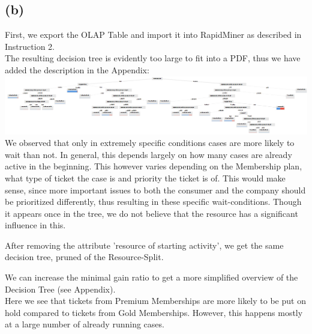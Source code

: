\documentclass[../../main.tex]{subfiles}
\begin{document}
\subsection*{(b)}
First, we export the OLAP Table and import it into RapidMiner as described in Instruction 2.\\
The resulting decision tree is evidently too large to fit into a PDF, thus we have added the description in the Appendix:\\
\includegraphics[width=\columnwidth]{img/RapidMiner_b_Decision_Tree.png}\\
We observed that only in extremely specific conditions cases are more likely to wait than not. In general, this depends largely on how many cases are already active in the beginning. This however varies depending on the Membership plan, what type of ticket the case is and priority the ticket is of. This would make sense, since more important issues to both the consumer and the company should be prioritized differently, thus resulting in these specific wait-conditions. Though it appears once in the tree, we do not believe that the resource has a significant influence in this.

After removing the attribute 'resource of starting activity', we get the same decision tree, pruned of the Resource-Split.

We can increase the minimal gain ratio to get a more simplified overview of the Decision Tree (see Appendix).\\
Here we see that tickets from Premium Memberships are more likely to be put on hold compared to tickets from Gold Memberships. However, this happens mostly at a large number of already running cases.
\end{document}
